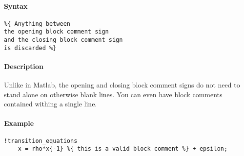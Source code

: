 


	\paragraph{Syntax}

\begin{verbatim}
%{ Anything between
the opening block comment sign
and the closing block comment sign
is discarded %}
\end{verbatim}

\paragraph{Description}

Unlike in Matlab, the opening and closing block comment signs do not
need to stand alone on otherwise blank lines. You can even have block
comments contained withing a single line.

\paragraph{Example}

\begin{verbatim}
!transition_equations
    x = rho*x{-1} %{ this is a valid block comment %} + epsilon;
\end{verbatim}


